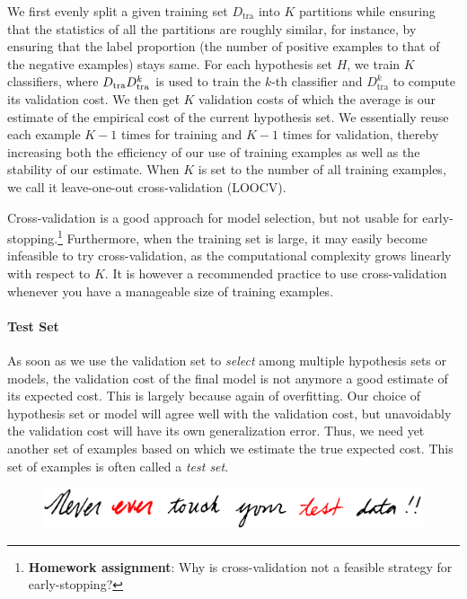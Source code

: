 \documentclass{report}
\newcommand{\tra}{\text{tra}}
\begin{document}
We first evenly split a given training set $D_{\tra}$ into $K$ partitions while
ensuring that the statistics of all the partitions are roughly similar, for
instance, by ensuring that the label proportion (the number of positive examples
to that of the negative examples) stays same. For each hypothesis set $H$, we
train $K$ classifiers, where $D_{\tra} \\ D_{\tra}^k$ is used to train the
$k$-th classifier and $D_{\tra}^k$ to compute its validation cost. We then get
$K$ validation costs of which the average is our estimate of the empirical cost
of the current hypothesis set. We essentially reuse each example $K-1$ times for
training and $K-1$ times for validation, thereby increasing both the efficiency
of our use of training examples as well as the stability of our estimate.  When
$K$ is set to the number of all training examples, we call it leave-one-out
cross-validation (LOOCV). 

Cross-validation is a good approach for model selection, but not usable for
early-stopping.\footnote{
    {\bf Homework assignment}: Why is cross-validation not a feasible strategy
    for early-stopping? 
} Furthermore, when the training set is large, it may easily become infeasible
to try cross-validation, as the computational complexity grows linearly with
respect to $K$. It is however a recommended practice to use cross-validation
whenever you have a manageable size of training examples.

\paragraph{Test Set}

As soon as we use the validation set to {\it select} among multiple hypothesis
sets or models, the validation cost of the final model is not anymore a good
estimate of its expected cost. This is largely because again of overfitting. Our
choice of hypothesis set or model will agree well with the validation cost, but
unavoidably the validation cost will have its own generalization error. Thus, we
need yet another set of examples based on which we estimate the true expected
cost. This set of examples is often called a {\it test set}. 

\begin{figure}[t]
    \centering
    \includegraphics[width=0.8\columnwidth]{figures/neverever.png}
\end{figure}
\end{document}
